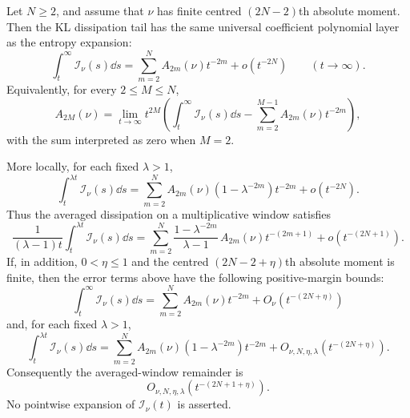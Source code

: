 \begin{proposition}%
\label{prop:dissipation-tail-coefficient-expansion}
Let \(N\ge2\), and assume that \(\nu\) has finite centred
\((2N-2)\)th absolute moment.  Then the KL dissipation tail has the same
universal coefficient polynomial layer as the entropy expansion:
\begin{equation}\label{eq:bregman-tail-coefficient-expansion}
\int_t^\infty \mathcal I_\nu(s)\dd s
=\sum_{m=2}^{N}A_{2m}(\nu)t^{-2m}+o(t^{-2N})
\qquad(t\to\infty).
\end{equation}
Equivalently, for every \(2\le M\le N\),
\begin{equation}\label{eq:bregman-tail-coefficient-recovery}
A_{2M}(\nu)
=
\lim_{t\to\infty}t^{2M}
\left(
\int_t^\infty \mathcal I_\nu(s)\dd s
-\sum_{m=2}^{M-1}A_{2m}(\nu)t^{-2m}
\right),
\end{equation}
with the sum interpreted as zero when \(M=2\).

More locally, for each fixed \(\lambda>1\),
\begin{equation}\label{eq:bregman-finite-window-coefficients}
\int_t^{\lambda t} \mathcal I_\nu(s)\dd s
=
\sum_{m=2}^{N}A_{2m}(\nu)(1-\lambda^{-2m})t^{-2m}
+o(t^{-2N}).
\end{equation}
Thus the averaged dissipation on a multiplicative window satisfies
\begin{equation}\label{eq:bregman-window-average-coefficients}
\frac{1}{(\lambda-1)t}\int_t^{\lambda t} \mathcal I_\nu(s)\dd s
=
\sum_{m=2}^{N}
\frac{1-\lambda^{-2m}}{\lambda-1}\,A_{2m}(\nu)t^{-(2m+1)}
+o(t^{-(2N+1)}).
\end{equation}
If, in addition, \(0<\eta\le1\) and the centred
\((2N-2+\eta)\)th absolute moment is finite, then the error terms above have
the following positive-margin bounds:
\[
\int_t^\infty \mathcal I_\nu(s)\dd s
=\sum_{m=2}^{N}A_{2m}(\nu)t^{-2m}+O_\nu(t^{-(2N+\eta)})
\]
and, for each fixed \(\lambda>1\),
\[
\int_t^{\lambda t} \mathcal I_\nu(s)\dd s
=
\sum_{m=2}^{N}A_{2m}(\nu)(1-\lambda^{-2m})t^{-2m}
 +O_{\nu,N,\eta,\lambda}(t^{-(2N+\eta)}).
\]
Consequently the averaged-window remainder is
\[
O_{\nu,N,\eta,\lambda}(t^{-(2N+1+\eta)}).
\]
No pointwise expansion of \(\mathcal I_\nu(t)\) is asserted.

\end{proposition}

